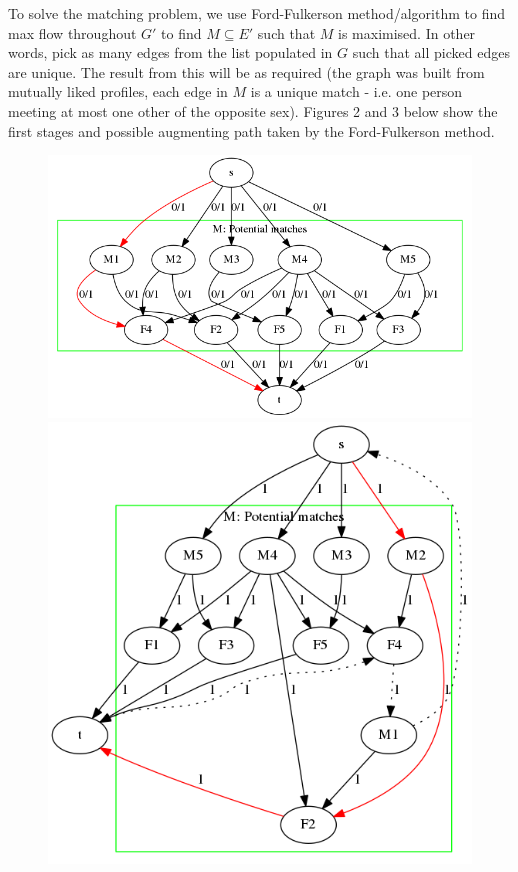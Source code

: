 \documentclass[11pt, a4paper]{article}
\begin{document}
To solve the matching problem, we use Ford-Fulkerson method/algorithm to find
max flow throughout $G'$ to find $M \subseteq E'$ such that $M$ is maximised. In
other words, pick as many edges from the list populated in $G$ such that all
picked edges are unique. The result from this will be as required (the graph was
built from mutually liked profiles, each edge in $M$ is a unique match - i.e.
one person meeting at most one other of the opposite sex). Figures 2 and 3
below show the first stages and possible augmenting path  taken by the
Ford-Fulkerson method.


\begin{figure}[ht!]
\includegraphics[scale=0.4]{q1matchset4.png}
\includegraphics[scale=0.4]{q1matchset6.png}

\end{figure}
\end{document}

